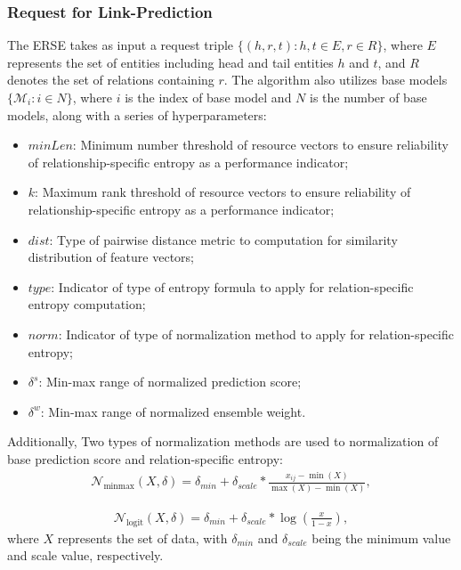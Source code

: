 \documentclass{article}
\begin{document}
\subsubsection{Request for Link-Prediction}

The ERSE takes as input a request triple $\{(h, r, t) : h, t \in E, r \in R\}$, where $E$ represents the set of entities including head and tail entities $h$ and $t$, and $R$ denotes the set of relations containing $r$. The algorithm also utilizes base models $\{\mathcal{M}_i : i \in N\}$, where $i$ is the index of base model and $N$ is the number of base models, along with a series of hyperparameters: 
\begin{itemize}
    \item $minLen$: Minimum number threshold of resource vectors to ensure reliability of relationship-specific entropy as a performance indicator;
    \item $k$: Maximum rank threshold of resource vectors to ensure reliability of relationship-specific entropy as a performance indicator;
    \item $dist$: Type of pairwise distance metric to computation for similarity distribution of feature vectors;
    \item $type$: Indicator of type of entropy formula to apply for relation-specific entropy computation;
    \item $norm$: Indicator of type of normalization method to apply for relation-specific entropy;
    \item $\delta^s$: Min-max range of normalized prediction score;
    \item $\delta^w$: Min-max range of normalized ensemble weight. 
\end{itemize}
Additionally, Two types of normalization methods are used to normalization of base prediction score and relation-specific entropy:
\begin{align}
\label{eq:NormMM}
    \mathcal{N}_{\text{minmax}}(X, \delta) = \delta_{min} + \delta_{scale}*\frac{x_{ij} - \min(X)}{\max(X) - \min(X)},
\end{align}%

\begin{align}
\label{eq:NormLogit}
    \mathcal{N}_{\text{logit}}(X, \delta) =  \delta_{min} + \delta_{scale}*\log\left(\frac{x}{1 - x}\right),
\end{align}%
where $X$ represents the set of data, with $\delta_{min}$ and $\delta_{scale}$ being the minimum value and scale value, respectively.
\end{document}
